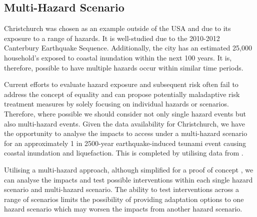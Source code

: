 \documentclass[review,3p,times,onecolumn,sort&compress,12pt]{elsarticle}
\let \cite \parencite
\begin{document}
\subsection{Multi-Hazard Scenario}
Christchurch was chosen as an example outside of the USA and due to its exposure to a range of hazards.
It is well-studied due to the 2010-2012 Canterbury Earthquake Sequence. 
Additionally, the city has an estimated 25,000 household’s exposed to coastal inundation within the next 100 years.
It is, therefore, possible to have multiple hazards occur within similar time periods.

Current efforts to evaluate hazard exposure and subsequent risk often fail to address the concept of equality and can propose potentially maladaptive risk treatment measures by solely focusing on individual hazards or scenarios. 
Therefore, where possible we should consider not only single hazard events but also multi-hazard events.
Given the data availability for Christchurch, we have the opportunity to analyse the impacts to access under a multi-hazard scenario for an approximately 1 in 2500-year earthquake-induced tsunami event causing coastal inundation and liquefaction. 
This is completed by utilising data from \cite{Mueller2019-hk, Tonkin_taylor2020-es}.

Utilising a multi-hazard approach, although simplified for a proof of concept \cite{Gehl_undated-rx}, we can analyse the impacts and test possible interventions within each single hazard scenario and multi-hazard scenario.
The ability to test interventions across a range of scenarios limits the possibility of providing adaptation options to one hazard scenario which may worsen the impacts from another hazard scenario.
\end{document}
